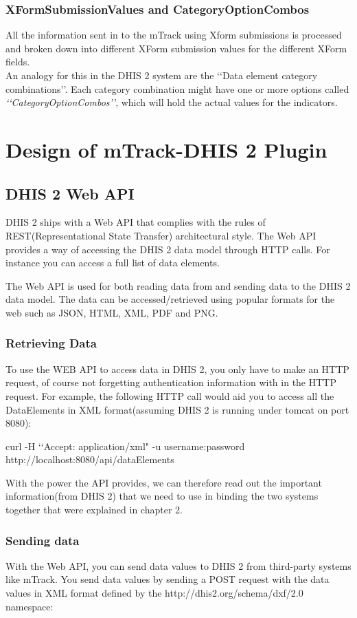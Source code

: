 \documentclass[11pt,a4paper]{article}
\begin{document}
\subsubsection{XFormSubmissionValues and CategoryOptionCombos}
All the information sent in to the mTrack using Xform submissions is processed and broken down into different XForm submission values for the different XForm fields.\\

An analogy for this in the DHIS 2 system are the \lq\lq Data element category combinations\rq\rq. Each category combination might have one or more options called \emph{\lq\lq CategoryOptionCombos\rq\rq}, which will hold the actual values for the indicators.
\section{Design of mTrack-DHIS 2 Plugin}
\subsection{DHIS 2 Web API}
DHIS 2 ships with a Web API that complies with the rules of REST(Representational State Transfer) architectural style. The Web API provides a way of accessing the DHIS 2 data model through HTTP calls. For instance you can access a full list of data elements.

The Web API is used for both reading data from and sending data to the DHIS 2 data model. The data can be accessed/retrieved using popular formats for the web such as JSON, HTML, XML, PDF and PNG.
\subsubsection{Retrieving Data}
To use the WEB API to access data in DHIS 2, you only have to make an HTTP request, of course not forgetting authentication information with in the HTTP request. For example, the following HTTP call would aid you to access all the DataElements in XML format(assuming DHIS 2 is running under tomcat on port 8080):

curl -H \lq\lq Accept: application/xml" -u username:password http://localhost:8080/api/dataElements

With the power the API provides, we can therefore read out the important information(from DHIS 2) that we need to use in binding the two systems together that were explained in chapter 2. 

\subsubsection{Sending data}
With the Web API, you can send data values to DHIS 2 from third-party systems like mTrack. You send data values by sending a POST request with the data values in XML format defined by the http://dhis2.org/schema/dxf/2.0 namespace:
\end{document}
